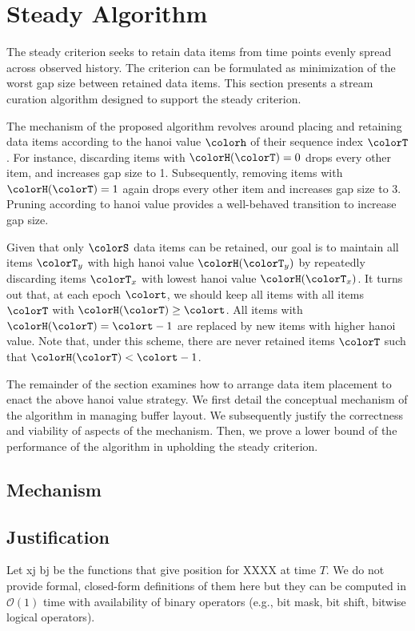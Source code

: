 \section{Steady Algorithm} \label{sec:steady}

The steady criterion seeks to retain data items from time points evenly spread across observed history.
The criterion can be formulated as minimization of the worst gap size between retained data items.
This section presents a stream curation algorithm designed to support the steady criterion.

The mechanism of the proposed algorithm revolves around placing and retaining data items according to the hanoi value $\colorh$ of their sequence index $\colorT$.
For instance, discarding items with $\colorH(\colorT) = 0$ drops every other item, and increases gap size to 1.
Subsequently, removing items with $\colorH(\colorT) = 1$ again drops every other item and increases gap size to 3.
Pruning according to hanoi value provides a well-behaved transition to increase gap size.

Given that only $\colorS$ data items can be retained, our goal is to maintain all items $\colorT_y$ with high hanoi value $\colorH(\colorT_y)$ by repeatedly discarding items $\colorT_x$ with lowest hanoi value $\colorH(\colorT_x)$.
It turns out that, at each epoch $\colort$, we should keep all items with all items $\colorT$ with $\colorH(\colorT) \geq \colort$.
All items with $\colorH(\colorT) = \colort - 1$ are replaced by new items with higher hanoi value.
Note that, under this scheme, there are never retained items $\colorT$ such that $\colorH(\colorT) < \colort - 1$.

The remainder of the section examines how to arrange data item placement to enact the above hanoi value strategy.
We first detail the conceptual mechanism of the algorithm in managing buffer layout.
We subsequently justify the correctness and viability of aspects of the mechanism.
Then, we prove a lower bound of the performance of the algorithm in upholding the steady criterion.

\subsection{Mechanism}

\subsection{Justification}

Let xj bj be the functions that give position for XXXX at time $T$.
We do not provide formal, closed-form definitions of them here but they can be computed in $\mathcal{O}(1)$ time with availability of binary operators (e.g., bit mask, bit shift, bitwise logical operators).


